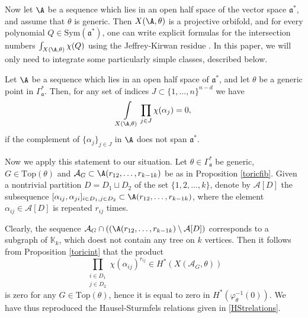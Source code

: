 Now let $\A$ be a  sequence which lies in an open half space 
of the vector space $\mathfrak{a}^*$, and assume that $ \theta $ is generic. 
Then $ X(\A,\theta) $ is a projective orbifold, and for every 
polynomial $Q\in \mathrm{Sym}(\mathfrak{a}^*)$, one can write explicit formulas 
for  the intersection numbers $\int_{X(\A,\theta)}\chi(Q)$ using the 
Jeffrey-Kirwan residue \cite{BV, SzV}. In this paper, we will only need to 
integrate  some particularly simple classes, described below.

\begin{prop}\label{toricint}
	Let $\A$ be a  sequence which lies in an open half space 
	of $\mathfrak{a}^*$, and let 
	$\theta$ be a generic point in $\Gamma_\mathfrak{a}^*$. 
	Then, for any set of indices $J\subset \{1, \ldots ,n\}^{n-d}$ we have  
	$$\int\limits_{X(\A,\theta)}\prod_{j\in J}\chi(\alpha_j) = 0,$$ if the 
	complement of $\{\alpha_j\}_{j\in J}$ in $\A$ does not span 
	$\mathfrak{a}^*$.
\end{prop}

Now we apply this statement to our situation.
Let $\theta\in\Gamma_{\mathfrak{a}}^*$ be generic, 
$G\in\mathrm{Top}(\theta)$ and $\mathcal{A}_G\subset\A(r_{12}, \ldots ,r_{k-1 k})$ 
be as in Proposition \ref{toricfib}. Given  a nontrivial partition $D=D_1\sqcup 
D_2$ of the set $\{1,2, \ldots ,k\}$, denote by $\mathcal{A}[{D}]$ the subsequence 
$[\alpha_{ij},\alpha_{ji}]_{\substack{i\in D_1, j\in D_2}}\subset\A(r_{12}, \ldots ,r_{k-1 k})$, 
where the element $\alpha_{ij}\in\mathcal{A}[{D}]$ is repeated $r_{ij}$ times.  


Clearly,  the sequence $\mathcal{A}_G\cap ((\A(r_{12}, \ldots ,r_{k-1 
k})\setminus\mathcal{A}[{D}])$
corresponds to a subgraph of $\mathbb{K}_k$, which doest not contain any tree 
on $k$ vertices. Then it follows from Proposition \ref{toricint} that the 
product $$\prod_{\substack{i\in D_1 \\ j\in D_2}}\chi(\alpha_{ij})^{r_{ij}}\in 
H^*(X(\mathcal{A}_G, \theta))$$ is zero for any $G\in\mathrm{Top}(\theta)$, hence it is equal to zero in $ H^*(\varphi^{-1}_\theta(0))$.  We have thus 
reproduced the Hausel-Sturmfels relations given in \eqref{HStrelations}.
